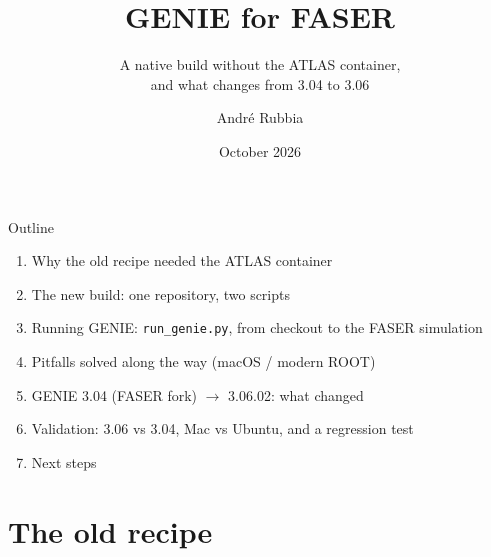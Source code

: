 \documentclass[10pt,aspectratio=169]{beamer}
\title{GENIE for FASER}
\subtitle{A native build without the ATLAS container,\\ and what changes from 3.04 to 3.06}
\author{André Rubbia}
\institute{ETH Zürich, IPA}
\date{October 2026}
\newcommand{\code}[1]{\texttt{\small #1}}
\begin{document}
\maketitle

\begin{frame}{Outline}
  \begin{enumerate}
    \item Why the old recipe needed the ATLAS container
    \item The new build: one repository, two scripts
    \item Running GENIE: \code{run\_genie.py}, from checkout to the FASER simulation
    \item Pitfalls solved along the way (macOS / modern ROOT)
    \item GENIE 3.04 (FASER fork) $\rightarrow$ 3.06.02: what changed
    \item Validation: 3.06 vs 3.04, Mac vs Ubuntu, and a regression test
    \item Next steps
  \end{enumerate}
\end{frame}

\section{The old recipe}
\end{document}
